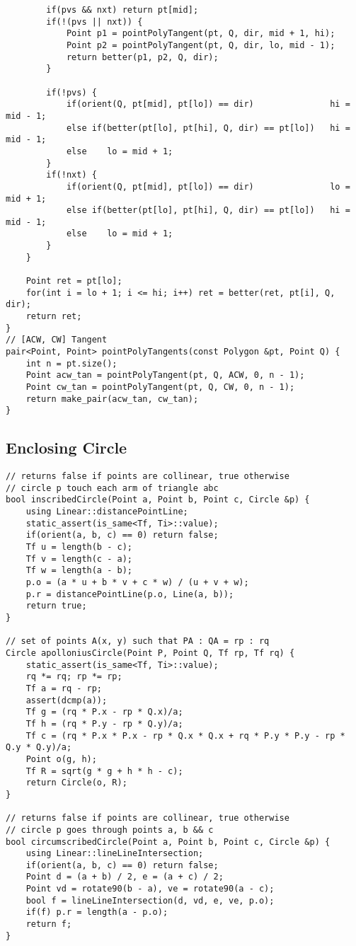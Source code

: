 \documentclass[FSZ,a4paper,onesided]{article}
\begin{document}
\begin{multicols*}{\COLS}
\begin{lstlisting}
        if(pvs && nxt) return pt[mid];
        if(!(pvs || nxt)) {
            Point p1 = pointPolyTangent(pt, Q, dir, mid + 1, hi);
            Point p2 = pointPolyTangent(pt, Q, dir, lo, mid - 1);
            return better(p1, p2, Q, dir);
        }

        if(!pvs) {
            if(orient(Q, pt[mid], pt[lo]) == dir)               hi = mid - 1;
            else if(better(pt[lo], pt[hi], Q, dir) == pt[lo])   hi = mid - 1;
            else    lo = mid + 1;
        }
        if(!nxt) {
            if(orient(Q, pt[mid], pt[lo]) == dir)               lo = mid + 1;
            else if(better(pt[lo], pt[hi], Q, dir) == pt[lo])   hi = mid - 1;
            else    lo = mid + 1;
        }
    }

    Point ret = pt[lo];
    for(int i = lo + 1; i <= hi; i++) ret = better(ret, pt[i], Q, dir);
    return ret;
}
// [ACW, CW] Tangent
pair<Point, Point> pointPolyTangents(const Polygon &pt, Point Q) {
    int n = pt.size();
    Point acw_tan = pointPolyTangent(pt, Q, ACW, 0, n - 1);
    Point cw_tan = pointPolyTangent(pt, Q, CW, 0, n - 1);
    return make_pair(acw_tan, cw_tan);
}\end{lstlisting}
\subsection{Enclosing Circle}
\begin{lstlisting}
// returns false if points are collinear, true otherwise
// circle p touch each arm of triangle abc
bool inscribedCircle(Point a, Point b, Point c, Circle &p) {
    using Linear::distancePointLine;
    static_assert(is_same<Tf, Ti>::value);
    if(orient(a, b, c) == 0) return false;
    Tf u = length(b - c);
    Tf v = length(c - a);
    Tf w = length(a - b);
    p.o = (a * u + b * v + c * w) / (u + v + w);
    p.r = distancePointLine(p.o, Line(a, b));
    return true;
}

// set of points A(x, y) such that PA : QA = rp : rq
Circle apolloniusCircle(Point P, Point Q, Tf rp, Tf rq) {
    static_assert(is_same<Tf, Ti>::value);
    rq *= rq; rp *= rp;
    Tf a = rq - rp;
    assert(dcmp(a));
    Tf g = (rq * P.x - rp * Q.x)/a;
    Tf h = (rq * P.y - rp * Q.y)/a;
    Tf c = (rq * P.x * P.x - rp * Q.x * Q.x + rq * P.y * P.y - rp * Q.y * Q.y)/a;
    Point o(g, h);
    Tf R = sqrt(g * g + h * h - c);
    return Circle(o, R);
}

// returns false if points are collinear, true otherwise
// circle p goes through points a, b && c
bool circumscribedCircle(Point a, Point b, Point c, Circle &p) {
    using Linear::lineLineIntersection;
    if(orient(a, b, c) == 0) return false;
    Point d = (a + b) / 2, e = (a + c) / 2;
    Point vd = rotate90(b - a), ve = rotate90(a - c);
    bool f = lineLineIntersection(d, vd, e, ve, p.o);
    if(f) p.r = length(a - p.o);
    return f;
}


\end{lstlisting}
\end{multicols*}
\end{document}
